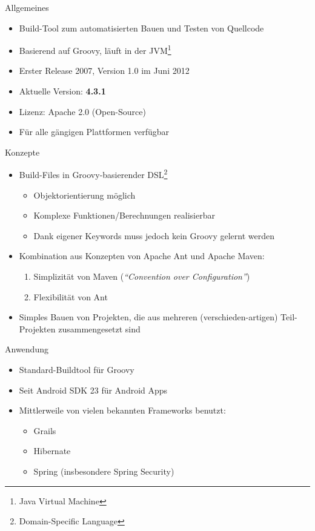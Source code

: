 \documentclass[newPxFont,numfooter,sectionpages]{beamer}
\begin{document}
\begin{frame}{Allgemeines}
	\begin{itemize}
		\item Build-Tool zum automatisierten Bauen und Testen von Quellcode
		\item Basierend auf Groovy, läuft in der JVM\footnote{Java Virtual Machine}
		\item Erster Release 2007, Version 1.0 im Juni 2012
		\item Aktuelle Version: \textbf{4.3.1}
		\item Lizenz: Apache 2.0 (Open-Source) 
		\item Für alle gängigen Plattformen verfügbar
	\end{itemize}
\end{frame}

\begin{frame}{Konzepte}
\begin{itemize}
	\item Build-Files in Groovy-basierender DSL\footnote{Domain-Specific Language}
		\begin{itemize}
			\item Objektorientierung möglich
			\item Komplexe Funktionen/Berechnungen realisierbar
			\item Dank eigener Keywords muss jedoch kein Groovy gelernt werden
		\end{itemize}
	\item Kombination aus Konzepten von \alert{Apache Ant} und \alert{Apache Maven}:
		\begin{enumerate}
			\item Simplizität von Maven (\emph{\enquote{Convention over Configuration}})
			\item Flexibilität von Ant
		\end{enumerate}
	\item Simples Bauen von Projekten, die aus mehreren (verschieden-artigen) Teil-Projekten zusammengesetzt sind
\end{itemize}
\end{frame}

\begin{frame}{Anwendung}
\begin{itemize}
	\item Standard-Buildtool für Groovy
	\item Seit Android SDK 23 für Android Apps
	\item Mittlerweile von vielen bekannten Frameworks benutzt:
	\begin{itemize}
		\item Grails
		\item Hibernate
		\item Spring (insbesondere Spring Security)
	\end{itemize}
\end{itemize}
\end{frame}
\end{document}
